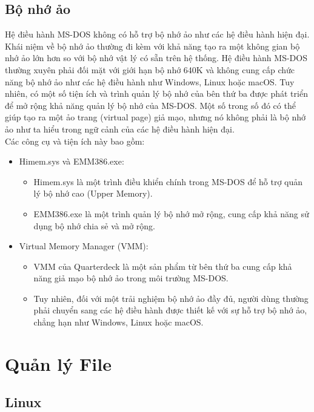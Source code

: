 \documentclass[12pt,a4paper]{article}
\begin{document}
\subsection{Bộ nhớ ảo}
Hệ điều hành MS-DOS không có hỗ trợ bộ nhớ ảo như các hệ điều hành hiện đại. Khái niệm về bộ nhớ ảo thường đi kèm với khả năng tạo ra một không gian bộ nhớ ảo lớn hơn so với bộ nhớ vật lý có sẵn trên hệ thống. Hệ điều hành MS-DOS thường xuyên phải đối mặt với giới hạn bộ nhớ 640K và không cung cấp chức năng bộ nhớ ảo như các hệ điều hành như Windows, Linux hoặc macOS.
Tuy nhiên, có một số tiện ích và trình quản lý bộ nhớ của bên thứ ba được phát triển để mở rộng khả năng quản lý bộ nhớ của MS-DOS. Một số trong số đó có thể giúp tạo ra một ảo trang (virtual page) giả mạo, nhưng nó không phải là bộ nhớ ảo như ta hiểu trong ngữ cảnh của các hệ điều hành hiện đại.\\

Các công cụ và tiện ích này bao gồm:
\begin{itemize}
	\item Himem.sys và EMM386.exe:
		\begin{itemize}
		\item Himem.sys là một trình điều khiển chính trong MS-DOS để hỗ trợ quản lý bộ nhớ cao (Upper Memory).
		\item EMM386.exe là một trình quản lý bộ nhớ mở rộng, cung cấp khả năng sử dụng bộ nhớ chia sẻ và mở rộng.
		\end{itemize}
	\item Virtual Memory Manager (VMM):
		\begin{itemize}
		\item VMM của Quarterdeck là một sản phẩm từ bên thứ ba cung cấp khả năng giả mạo bộ nhớ ảo trong môi trường MS-DOS.
		\item Tuy nhiên, đối với một trải nghiệm bộ nhớ ảo đầy đủ, người dùng thường phải chuyển sang các hệ điều hành được thiết kế với sự hỗ trợ bộ nhớ ảo, chẳng hạn như Windows, Linux hoặc macOS.
		\end{itemize}
\end{itemize}

\section{Quản lý File}
\subsection{Linux}
\end{document}
